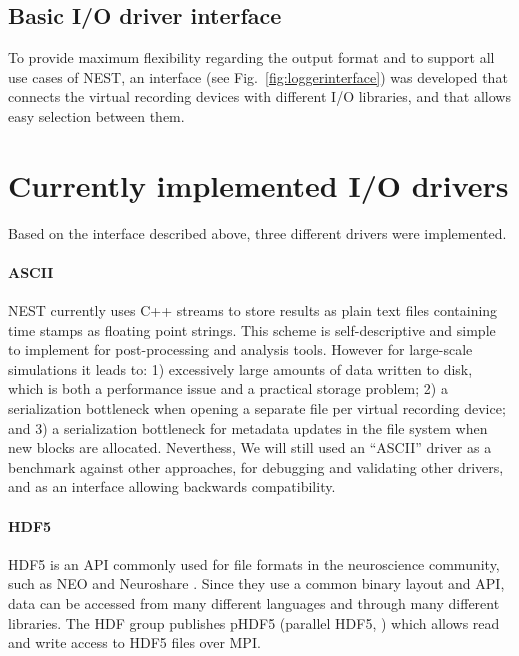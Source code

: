 \documentclass[]{YIC2015}
\begin{document}
\subsection{Basic I/O driver interface}

To provide maximum flexibility regarding the output format and to support all 
use cases of NEST, an interface (see Fig.~\ref{fig:loggerinterface}) was 
developed that connects the virtual recording devices with different I/O 
libraries, and that allows easy selection between them.


\section{Currently implemented I/O drivers}
\label{sec:io-drivers}

Based on the interface described above, three different drivers were
implemented.

\paragraph{ASCII}

NEST currently uses C++ streams to store results as plain text files
containing time stamps as floating point strings. This scheme is
self-descriptive and simple to implement for post-processing and
analysis tools.
%
However for large-scale simulations it leads to: 1) excessively large
amounts of data written to disk, which is both a performance issue and
a practical storage problem; 2) a serialization bottleneck when
opening a separate file per virtual recording device; and 3) a
serialization bottleneck for metadata updates in the file system when
new blocks are allocated.
Neverthess, We will still used an ``ASCII'' driver as a benchmark against other
approaches, for debugging and validating other drivers, and as an
interface allowing backwards compatibility.

\paragraph{HDF5}

HDF5 is an API commonly used for file formats in the neuroscience
community, such as NEO \cite{neo} and Neuroshare \cite{neuroshare}.
Since they use a common binary layout and API, data can be accessed
from many different languages and through many different libraries.
The HDF group publishes pHDF5 (parallel HDF5, \cite{hdf5}) which
allows read and write access to HDF5 files over MPI.
\end{document}

